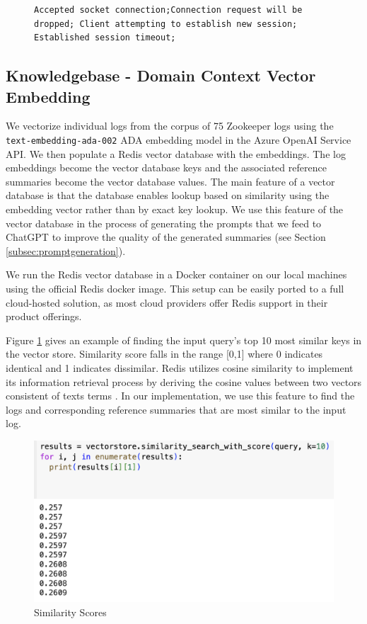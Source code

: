 \documentclass[conference]{IEEEtran}
\begin{document}
\begin{figure}[ht]
\begin{lstlisting}[numbers=none, caption=LogSummary Zookeeper Summary, label={lst:zookeeper-summary}]
 Accepted socket connection;Connection request will be dropped; Client attempting to establish new session; Established session timeout;
\end{lstlisting}
\end{figure} 


\subsection{Knowledgebase - Domain Context Vector Embedding} \label{subsec:vectorstore}

We vectorize individual logs from the corpus of 75 Zookeeper logs using the \lstinline{text-embedding-ada-002} ADA embedding model in the Azure OpenAI Service API. We then populate a Redis vector database with the embeddings. The log embeddings become the vector database keys and the associated reference summaries become the vector database values. The main feature of a vector database is that the database enables lookup based on similarity using the embedding vector rather than by exact key lookup. We use this feature of the vector database in the process of generating the prompts that we feed to ChatGPT to improve the quality of the generated summaries (see Section \ref{subsec:promptgeneration}).

We run the Redis vector database in a Docker container on our local machines using the official Redis docker image. This setup can be easily ported to a full cloud-hosted solution, as most cloud providers offer Redis support in their product offerings.

Figure \ref{fig:similar-label} gives an example of finding the input query's top 10 most similar keys in the vector store. Similarity score falls in the range [0,1] where 0 indicates identical and 1 indicates dissimilar. Redis utilizes cosine similarity to implement its information retrieval process by deriving the cosine values between two vectors consistent of texts terms \cite{cosine-sim}. In our implementation, we use this feature to find the logs and corresponding reference summaries that are most similar to the input log.


\begin{figure} [ht]
    \centering
    \includegraphics[width=0.8\linewidth]{Similarity.png}
    \caption{Similarity Scores}
    \label{fig:similar-label}
\end{figure}
\end{document}
